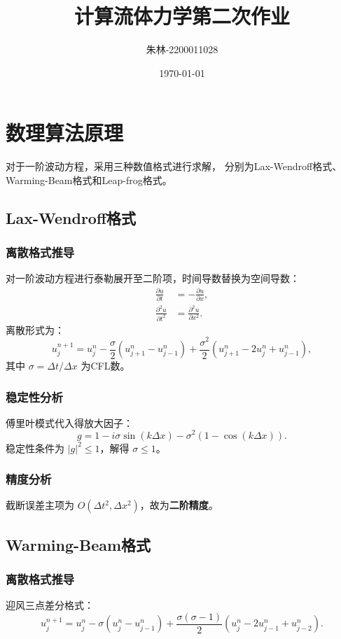 \documentclass[UTF8]{ctexart}
\begin{document}
\title{计算流体力学第二次作业}
\author{朱林-2200011028}
\date{\today}
\maketitle

\section{数理算法原理}
对于一阶波动方程，采用三种数值格式进行求解，
分别为Lax-Wendroff格式、Warming-Beam格式和Leap-frog格式。
\subsection{Lax-Wendroff格式}
\subsubsection{离散格式推导}
对一阶波动方程进行泰勒展开至二阶项，时间导数替换为空间导数：
\begin{align}
\frac{\partial u}{\partial t} &= -\frac{\partial u}{\partial x}, \\
\frac{\partial^2 u}{\partial t^2} &= \frac{\partial^2 u}{\partial x^2}.
\end{align}
离散形式为：
\begin{equation}
u_j^{n+1} = u_j^n - \frac{\sigma}{2}(u_{j+1}^n - u_{j-1}^n) + \frac{\sigma^2}{2}(u_{j+1}^n - 2u_j^n + u_{j-1}^n),
\end{equation}
其中 $\sigma = \Delta t / \Delta x$ 为CFL数。

\subsubsection{稳定性分析}
傅里叶模式代入得放大因子：
\begin{equation}
g = 1 - i\sigma \sin(k\Delta x) - \sigma^2(1 - \cos(k\Delta x)).
\end{equation}
稳定性条件为 $|g|^2 \leq 1$，解得 $\sigma \leq 1$。

\subsubsection{精度分析}
截断误差主项为 $O(\Delta t^2, \Delta x^2)$，故为\textbf{二阶精度}。

\subsection{Warming-Beam格式}
\subsubsection{离散格式推导}
迎风三点差分格式：
\begin{equation}
u_j^{n+1} = u_j^n - \sigma(u_j^n - u_{j-1}^n) + \frac{\sigma(\sigma-1)}{2}(u_j^n - 2u_{j-1}^n + u_{j-2}^n).
\end{equation}
\end{document}
